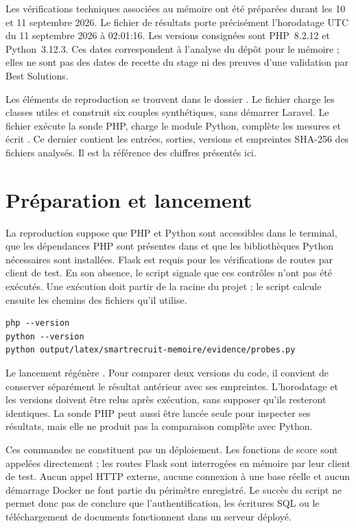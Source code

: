 Les vérifications techniques associées au mémoire ont été préparées durant les 10 et 11 septembre 2026. Le fichier de résultats porte précisément l'horodatage UTC du 11 septembre 2026 à 02:01:16. Les versions consignées sont PHP~8.2.12 et Python~3.12.3. Ces dates correspondent à l'analyse du dépôt pour le mémoire ; elles ne sont pas des dates de recette du stage ni des preuves d'une validation par Best Solutions.

Les éléments de reproduction se trouvent dans le dossier . Le fichier  charge les classes utiles et construit six couples synthétiques, sans démarrer Laravel. Le fichier  exécute la sonde PHP, charge le module Python, complète les mesures et écrit . Ce dernier contient les entrées, sorties, versions et empreintes SHA-256 des fichiers analysés. Il est la référence des chiffres présentés ici.

\section{Préparation et lancement}

La reproduction suppose que PHP et Python sont accessibles dans le terminal, que les dépendances PHP sont présentes dans  et que les bibliothèques Python nécessaires sont installées. Flask est requis pour les vérifications de routes par client de test. En son absence, le script signale que ces contrôles n'ont pas été exécutés. Une exécution doit partir de la racine du projet ; le script calcule ensuite les chemins des fichiers qu'il utilise.

\begin{lstlisting}[caption={Commandes de reproduction depuis la racine}]
php --version
python --version
python output/latex/smartrecruit-memoire/evidence/probes.py
\end{lstlisting}

Le lancement régénère . Pour comparer deux versions du code, il convient de conserver séparément le résultat antérieur avec ses empreintes. L'horodatage et les versions doivent être relus après exécution, sans supposer qu'ils resteront identiques. La sonde PHP peut aussi être lancée seule pour inspecter ses résultats, mais elle ne produit pas la comparaison complète avec Python.

Ces commandes ne constituent pas un déploiement. Les fonctions de score sont appelées directement ; les routes Flask sont interrogées en mémoire par leur client de test. Aucun appel HTTP externe, aucune connexion à une base réelle et aucun démarrage Docker ne font partie du périmètre enregistré. Le succès du script ne permet donc pas de conclure que l'authentification, les écritures SQL ou le téléchargement de documents fonctionnent dans un serveur déployé.

